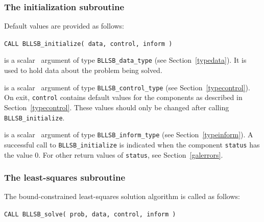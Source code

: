 \documentclass{galahad}
\newcommand{\packagename}{BLLSB}
\begin{document}

\subsubsection{The initialization subroutine}\label{subinit}
 Default values are provided as follows:
\vspace*{1mm}

\hspace{8mm}
{\tt CALL \packagename\_initialize( data, control, inform )}

\vspace*{-3mm}
\begin{description}

 is a scalar \intentinout\ argument of type
{\tt \packagename\_data\_type}
(see Section~\ref{typedata}). It is used to hold data about the problem being
solved.

 is a scalar \intentout\ argument of type
{\tt \packagename\_control\_type}
(see Section~\ref{typecontrol}).
On exit, {\tt control} contains default values for the components as
described in Section~\ref{typecontrol}.
These values should only be changed after calling
{\tt \packagename\_initialize}.

 is a scalar \intentout\ argument of type
{\tt \packagename\_inform\_type}
(see Section~\ref{typeinform}). A successful call to
{\tt \packagename\_initialize}
is indicated when the  component {\tt status} has the value 0.
For other return values of {\tt status}, see Section~\ref{galerrors}.

\end{description}


\subsubsection{The least-squares subroutine}\label{qps}
The bound-constrained least-squares solution algorithm is called as follows:
\vspace*{1mm}

\hspace{8mm}
{\tt CALL \packagename\_solve( prob, data, control, inform )}
\end{document}
